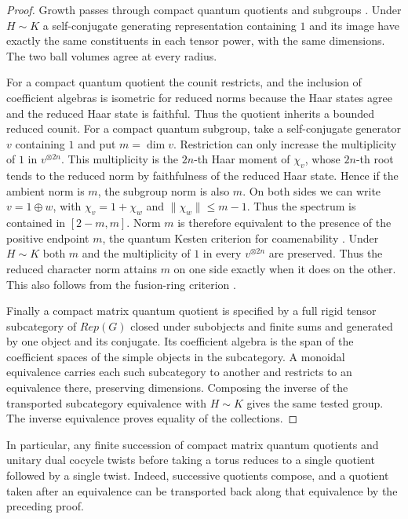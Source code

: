 \documentclass[11pt,a4paper]{article}
\theoremstyle{remark}
\begin{document}
\begin{proof}
Growth passes through compact quantum quotients and subgroups
\cite{dpr}. Under $H\sim K$ a self-conjugate generating representation
containing $1$ and its image have exactly the same constituents in
each tensor power, with the same dimensions. The two ball volumes agree
at every radius.

For a compact quantum quotient the counit restricts, and the inclusion
of coefficient algebras is isometric for reduced norms because the Haar states
agree and the reduced Haar state is faithful. Thus the quotient inherits
a bounded reduced counit. For a compact quantum subgroup, take a self-conjugate generator
$v$ containing $1$ and put $m=\dim v$. Restriction can only increase
the multiplicity of $1$ in $v^{\otimes 2n}$. This multiplicity is the
$2n$-th Haar moment of $\chi_v$, whose $2n$-th root tends to the
reduced norm by faithfulness of the reduced Haar state. Hence if the
ambient norm is $m$, the subgroup norm is also $m$. On both sides we can write $v=1\oplus w$, with
$\chi_v=1+\chi_w$ and $\|\chi_w\|\le m-1$. Thus the spectrum is
contained in $[2-m,m]$. Norm $m$ is therefore equivalent to the
presence of the positive endpoint $m$, the quantum Kesten criterion
for coamenability \cite{bp}.
Under $H\sim K$ both $m$ and the multiplicity of $1$ in every
$v^{\otimes 2n}$ are preserved. Thus the reduced character norm attains
$m$ on one side exactly when it does on the other. This also follows
from the fusion-ring criterion \cite[Theorem~4.5]{kyed}.

Finally a compact matrix quantum quotient is specified by a full rigid
tensor subcategory of $Rep(G)$ closed under subobjects and
finite sums and generated by one object and its conjugate. Its coefficient
algebra is the span of the coefficient spaces of the simple objects in
the subcategory. A monoidal equivalence carries each such subcategory
to another and restricts to an equivalence there, preserving dimensions.
Composing the inverse of the transported subcategory equivalence with $H\sim K$ gives the same
tested group. The inverse equivalence proves equality of the collections.
\end{proof}

In particular, any finite succession of compact matrix quantum quotients
and unitary dual cocycle twists before taking a torus reduces to a
single quotient followed by a single twist. Indeed, successive quotients compose,
and a quotient taken after an equivalence can be transported back along
that equivalence by the preceding proof.
\end{document}

